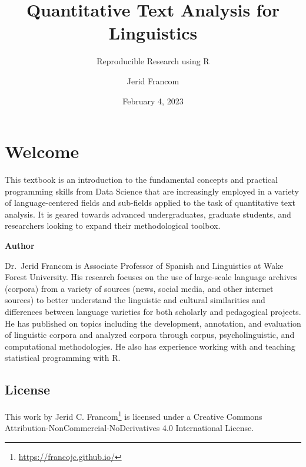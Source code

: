 \documentclass[
  letterpaper,
]{scrbook}
\title{Quantitative Text Analysis for Linguistics}
\subtitle{Reproducible Research using R}
\author{Jerid Francom}
\date{February 4, 2023}
\renewcommand*\contentsname{Table of contents}
\newcommand\contentsname{Table of contents}
\DeclareRobustCommand{\href}[2]{#2\footnote{\url{#1}}}
\begin{document}
\frontmatter
\maketitle
\ifdefined\Shaded\renewenvironment{Shaded}{\begin{tcolorbox}[breakable, boxrule=0pt, enhanced, frame hidden, colback={shadecolor}]}{\end{tcolorbox}}\fi

\renewcommand*\contentsname{Table of contents}
{
\setcounter{tocdepth}{2}
\tableofcontents
}
\mainmatter
{}

\hypertarget{welcome}{%
\chapter*{Welcome}\label{welcome}}


This textbook is an introduction to the fundamental concepts and
practical programming skills from Data Science that are increasingly
employed in a variety of language-centered fields and sub-fields applied
to the task of quantitative text analysis. It is geared towards advanced
undergraduates, graduate students, and researchers looking to expand
their methodological toolbox.

\textbf{Author}

Dr.~Jerid Francom is Associate Professor of Spanish and Linguistics at
Wake Forest University. His research focuses on the use of large-scale
language archives (corpora) from a variety of sources (news, social
media, and other internet sources) to better understand the linguistic
and cultural similarities and differences between language varieties for
both scholarly and pedagogical projects. He has published on topics
including the development, annotation, and evaluation of linguistic
corpora and analyzed corpora through corpus, psycholinguistic, and
computational methodologies. He also has experience working with and
teaching statistical programming with R.

\hypertarget{license}{%
\section*{License}\label{license}}


This work by \href{https://francojc.github.io/}{Jerid C. Francom} is
licensed under a Creative Commons
Attribution-NonCommercial-NoDerivatives 4.0 International License.
\end{document}
